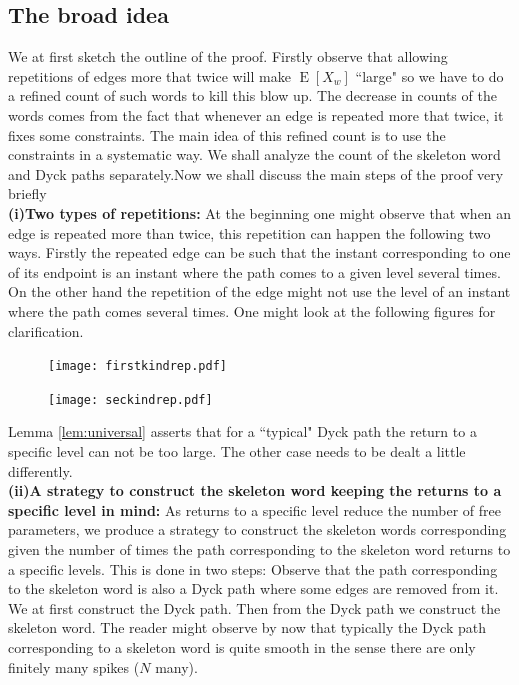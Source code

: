 \documentclass[12pt]{article}
\numberwithin{equation}{section}
\numberwithin{equation}{section}
\theoremstyle{definition}
\DeclareMathOperator{\E}{E} \DeclareMathOperator{\var}{Var}
\renewcommand{\1}{\bf 1}
\begin{document}
\subsection{The broad idea}
We at first sketch the outline of the proof. Firstly observe that allowing repetitions of edges more that twice will make $\E\left[ X_{w} \right]$ ``large" so we have to do a refined count of such words to kill this blow up. The decrease in counts of the words comes from the fact that whenever an edge is repeated more that twice, it fixes some constraints. The main idea of this refined count is to use the constraints in a systematic way. We shall analyze the count of the skeleton word and Dyck paths separately.Now we shall discuss the main steps of the proof very briefly\\
\textbf{(i)Two types of repetitions:}
At the beginning one might observe that when an edge is repeated more than twice, this repetition can happen the following two ways. Firstly the repeated edge can be such that the instant corresponding to one of its endpoint is an instant where the path comes to a given level several times. On the other hand the repetition of the edge might not use the level of an instant where the path comes several times. One might look at the following figures for clarification. 
\begin{figure}[H]
        \begin{center}
                \texttt{[image: firstkindrep.pdf]}
        ~ %
      \end{center}   
 \end{figure}
 \begin{figure}[H]
        \begin{center}
                \texttt{[image: seckindrep.pdf]}
        ~ %
      \end{center}   
 \end{figure}
Lemma \ref{lem:universal} asserts that for a ``typical" Dyck path the return to a specific level can not be too large. The other case needs to be dealt a little differently.\\
\textbf{(ii)A strategy to construct the skeleton word keeping the returns to a specific level in mind:} As returns to a specific level reduce the number of free parameters, we produce a strategy to construct the skeleton words corresponding given the number of times the path corresponding to the skeleton word returns to a specific levels. This is done in two steps: Observe that the path corresponding to the skeleton word is also a Dyck path where some edges are removed from it. We at first construct the Dyck path. Then from the Dyck path we construct the skeleton word. The reader might observe by now that typically the Dyck path corresponding to a skeleton word is quite smooth in the sense there are only finitely many spikes ($N$ many).
\end{document}
